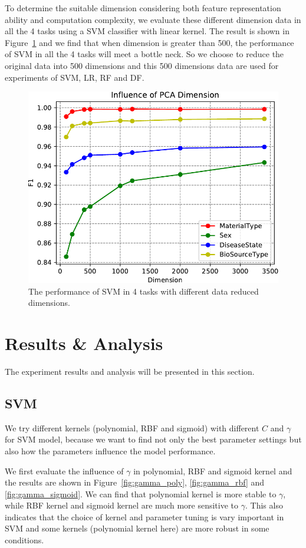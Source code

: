 \documentclass[sigconf]{acmart}
\begin{document}
	To determine the suitable dimension considering both feature representation ability and computation complexity, we evaluate these different dimension data in all the 4 tasks using a SVM classifier with linear kernel. The result is shown in Figure~\ref{fig:PCA_Dimension} and we find that when dimension is greater than 500, the performance of SVM in all the 4 tasks will meet a bottle neck. So we choose to reduce the original data into 500 dimensions and this 500 dimensions data are used for experiments of SVM, LR, RF and DF.
	
\begin{figure}[h]
\centering
\includegraphics[width=0.8\linewidth]{../figs/PCA_Dimension}
\caption{The performance of SVM in 4 tasks with different data reduced dimensions.}
\label{fig:PCA_Dimension}
\end{figure}
	
\section{Results \& Analysis}
The experiment results and analysis will be presented in this section.

\subsection{SVM}
We try different kernels (polynomial, RBF and sigmoid) with different $C$ and $\gamma$ for SVM model, because we want to find not only the best parameter settings but also how the parameters influence the model performance. 

We first evaluate the influence of $\gamma$ in polynomial, RBF and sigmoid kernel and the results are shown in Figure~\ref{fig:gamma_poly}, \ref{fig:gamma_rbf} and \ref{fig:gamma_sigmoid}. We can find that polynomial kernel is more stable to $\gamma$, while RBF kernel and sigmoid kernel are much more sensitive to $\gamma$. This also indicates that the choice of kernel and parameter tuning is vary important in SVM and some kernels (polynomial kernel here) are more robust in some conditions.
\end{document}
